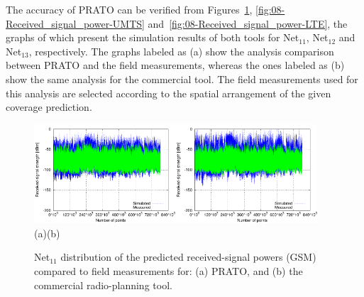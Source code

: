 The accuracy of PRATO can be verified from Figures~\ref{fig:08-Received_signal_power-GSM},
\ref{fig:08-Received_signal_power-UMTS} and~\ref{fig:08-Received_signal_power-LTE},
the graphs of which present the simulation results of both tools for
Net$_{11}$, Net$_{12}$ and Net$_{13}$, respectively. The graphs
labeled as (a) show the analysis comparison between PRATO and the
field measurements, whereas the ones labeled as (b) show the same
analysis for the commercial tool. The field measurements used for
this analysis are selected according to the spatial arrangement of
the given coverage prediction.

\begin{figure}[h]
\centering

\includegraphics[width=0.47\textwidth]{08-real_network_planning/img/gsm_prato_rcv_pwr}\includegraphics[width=0.47\textwidth]{08-real_network_planning/img/gsm_tcpu_rcv_pwr}\\\hspace{0.4cm}(a)\hspace{6.7cm}(b)

\caption{Net$_{11}$ distribution of the predicted received-signal powers (GSM)
compared to field measurements for: (a) PRATO, and (b) the commercial
radio-planning tool.\label{fig:08-Received_signal_power-GSM}}
\end{figure}


